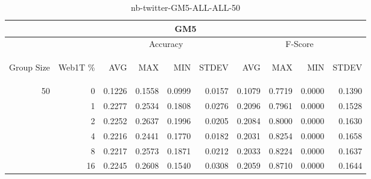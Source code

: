\begin{center}
\begin{table}[htbp]
\begin{tabular}{ | r | r | r | r | r | r | r | r | r | r |}
\hline
\multicolumn{10}{|c|}{GM5}\\
\hline
 & & \multicolumn{4}{|c|}{Accuracy} & \multicolumn{4}{|c|}{F-Score}\\ \cline{3-10}
\begin{sideways}Group Size\end{sideways} & \begin{sideways}Web1T \%\end{sideways} & \begin{sideways}AVG\end{sideways} & \begin{sideways}MAX\end{sideways} & \begin{sideways}MIN\end{sideways} & \begin{sideways}STDEV\end{sideways} & \begin{sideways}AVG\end{sideways} & \begin{sideways}MAX\end{sideways} & \begin{sideways}MIN\end{sideways} & \begin{sideways}STDEV\end{sideways}\\
\hline
\multirow{5}{*}{50}
 & 0 & 0.1226 & 0.1558 & 0.0999 & 0.0157 & 0.1079 & 0.7719 & 0.0000 & 0.1390\\ \cline{2-10}
 & 1 & 0.2277 & 0.2534 & 0.1808 & 0.0276 & 0.2096 & 0.7961 & 0.0000 & 0.1528\\ \cline{2-10}
 & 2 & 0.2252 & 0.2637 & 0.1996 & 0.0205 & 0.2084 & 0.8000 & 0.0000 & 0.1630\\ \cline{2-10}
 & 4 & 0.2216 & 0.2441 & 0.1770 & 0.0182 & 0.2031 & 0.8254 & 0.0000 & 0.1658\\ \cline{2-10}
 & 8 & 0.2217 & 0.2573 & 0.1871 & 0.0212 & 0.2033 & 0.8224 & 0.0000 & 0.1637\\ \cline{2-10}
 & 16 & 0.2245 & 0.2608 & 0.1540 & 0.0308 & 0.2059 & 0.8710 & 0.0000 & 0.1644\\ \cline{2-10}
\hline
\end{tabular}
\caption{nb-twitter-GM5-ALL-ALL-50}
\label{table:nb-twitter-GM5-ALL-ALL-50}
\end{table}
\end{center}

